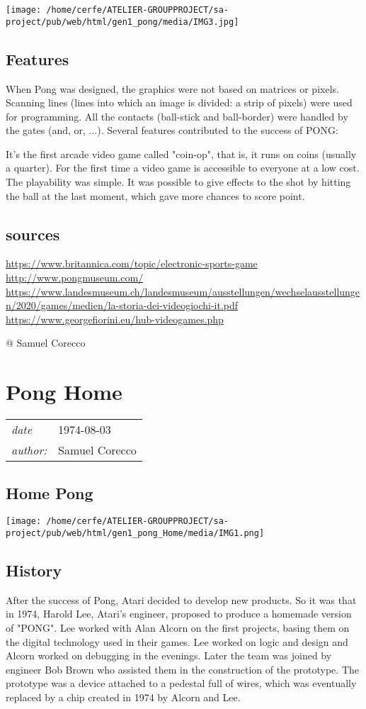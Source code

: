 \documentclass[a4paper,10pt]{book}
\newcommand{\pageHeader}[4]{
    \section{#1}
    \vspace{-0.3cm}
    \begin{table}[h!]
     \begin{tabular}{ll}
        \hline
        \textit{date} & #2 \\
        \textit{author: } & #3\\
        \hline
     \end{tabular}
    \end{table}
    \vspace{-0.3cm}
}
\begin{document}
 
 \texttt{[image: /home/cerfe/ATELIER-GROUPPROJECT/sa-project/pub/web/html/gen1\_pong/media/IMG3.jpg]}
 
 
 
 
 \subsection{Features }
 When Pong was designed, the graphics were not based on matrices or pixels. Scanning lines (lines into which an image is divided: a strip of pixels) were used for programming. All the contacts (ball-stick and ball-border) were handled by the gates (and, or, ...). Several features contributed to the success of PONG:
 
 
 It's the first arcade video game called "coin-op", that is, it runs on coins (usually a quarter). 
 For the first time a video game is accessible to everyone at a low cost. The playability was simple.   
 It was possible to give effects to the shot by hitting the ball at the last moment, which gave more chances to score point. 
 
 \subsection{sources }
 
 \href{https://www.britannica.com/topic/electronic-sports-game}{https://www.britannica.com/topic/electronic-sports-game }
 \href{http://www.pongmuseum.com/}{http://www.pongmuseum.com/ }
 \href{https://www.landesmuseum.ch/landesmuseum/ausstellungen/wechselausstellungen/2020/games/medien/la-storia-dei-videogiochi-it.pdf}{https://www.landesmuseum.ch/landesmuseum/ausstellungen/wechselausstellungen/2020/games/medien/la-storia-dei-videogiochi-it.pdf }
 \href{https://www.georgefiorini.eu/hub-videogames.php}{https://www.georgefiorini.eu/hub-videogames.php }
 
 
 @ Samuel Corecco 
 
 \newpage\pageHeader{Pong Home}{1974-08-03}{Samuel Corecco}{A page about the console Pong Home}
 \subsection{Home Pong }
     
 \texttt{[image: /home/cerfe/ATELIER-GROUPPROJECT/sa-project/pub/web/html/gen1\_pong\_Home/media/IMG1.png]}
 
 
 \subsection{History }
 After the success of Pong, Atari decided to develop new products. So it was that in 1974, Harold Lee, Atari's engineer, proposed to produce a homemade version of "PONG". Lee worked with Alan Alcorn on the first projects, basing them on the digital technology used in their games. Lee worked on logic and design and Alcorn worked on debugging in the evenings. Later the team was joined by engineer Bob Brown who assisted them in the construction of the prototype. The prototype was a device attached to a pedestal full of wires, which was eventually replaced by a chip created in 1974 by Alcorn and Lee.
           
\end{document}
